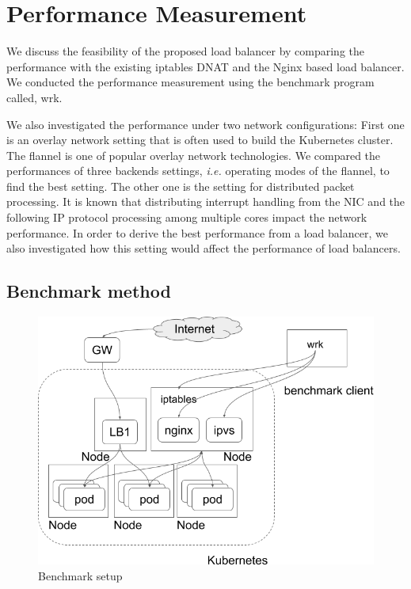 \section{Performance Measurement}\label{Performance Measurement}


We discuss the feasibility of the proposed load balancer by comparing the performance with the existing iptables DNAT and the Nginx based load balancer. 
We conducted the performance measurement using the benchmark program called, wrk\cite{Glozer2016}.

We also investigated the performance under two network configurations: 
First one is an overlay network setting\cite{Sill2016,Marmol2015} that is often used to build the Kubernetes cluster. 
The flannel\cite{CoreOSFlannel} is one of popular overlay network technologies. 
We compared the performances of three backends settings\cite{CoreOSFlannelBackend}, 
{\it i.e.} operating modes of the flannel, to find the best setting.
The other one is the setting for distributed packet processing.
It is known that distributing interrupt handling from the NIC and the following IP protocol processing 
among multiple cores impact the network performance.
In order to derive the best performance from a load balancer, 
we also investigated how this setting would affect the performance of load balancers.


\subsection{Benchmark method}

\begin{figure}
\includegraphics[width=\columnwidth]{Figs/benchmark-schem}
\caption{Benchmark setup}
\label{fig:benchmark-schem}
\end{figure}

